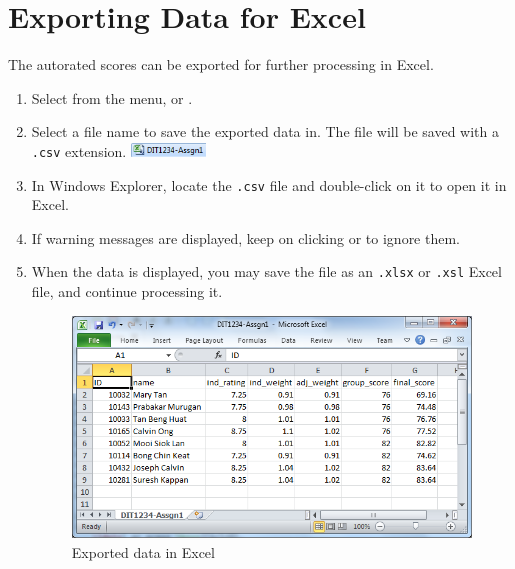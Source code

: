 \documentclass[a4paper,11pt]{refart}
\begin{document}
\section{Exporting Data for Excel}
The autorated scores can be exported for further processing in Excel.
\begin{enumerate}
\item Select  from the menu, or .
\item Select a file name to save the exported data in. The file will be saved with a \texttt{.csv} extension. \includegraphics[height=1em]{csv}
\item In Windows Explorer, locate the \texttt{.csv} file and double-click on it to open it in Excel.
\item If warning messages are displayed, keep on clicking  or  to ignore them.
\item When the data is displayed, you may save the file as an \texttt{.xlsx} or \texttt{.xsl} Excel file, and continue processing it.

\begin{figure}[hbt!]
\includegraphics[width=\textwidth]{excel}
\caption{Exported data in Excel}
\end{figure}

\end{enumerate}



\end{document}
